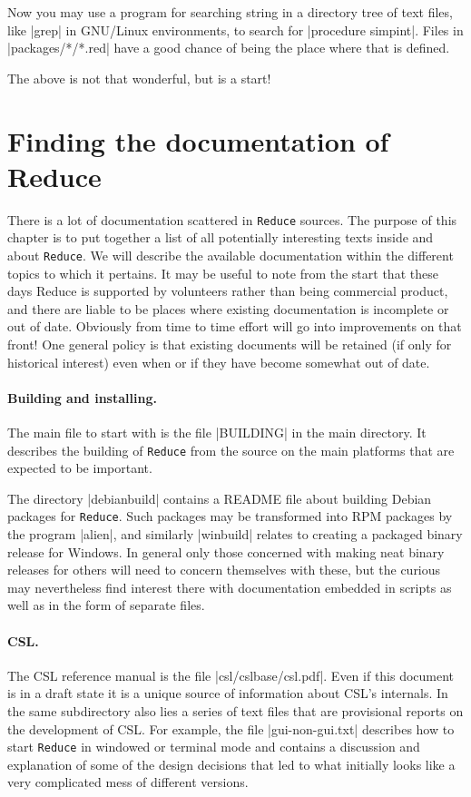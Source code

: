 \documentclass[12pt,twoside,openright]{memoir}
\newcommand{\reduce}{\texttt{Reduce}\xspace}
\begin{document}
Now you may use a program for searching string in a directory tree of text
files, like |grep| in GNU/Linux environments, to search for
|procedure simpint|. Files in |packages/*/*.red| have a good chance of being
the place where that is defined.

The above is not that wonderful, but is a start!


\section{Finding the documentation of Reduce}

There is a lot of documentation scattered in \reduce sources. The purpose of
this chapter is to put together a list of all potentially interesting texts
inside and about \reduce. We will describe the available documentation within
the different topics to which it pertains.
It may be useful to note from the start that these days Reduce is supported
by volunteers rather than being commercial product, and there are liable to
be places where existing documentation is incomplete or out of date. Obviously
from time to time effort will go into improvements on that front! One general
policy is that existing documents will be retained (if only for historical
interest) even when or if they have become somewhat out of date. 

\paragraph{Building and installing.}
The main file to start with is the file |BUILDING| in the main directory. It
describes the building of \reduce from the source on the main platforms
that are expected to be important.

The directory |debianbuild| contains a README file about building Debian
packages for \reduce. Such packages may be transformed into RPM packages by the
program |alien|, and similarly |winbuild| relates to creating a packaged
binary release for Windows. In general only those concerned with making
neat binary releases for others will need to concern themselves with these,
but the curious may nevertheless find interest there with documentation
embedded in scripts as well as in the form of separate files.

\paragraph{CSL.}
The CSL reference manual is the file |csl/cslbase/csl.pdf|. Even if this
document is in a draft state it is a unique source of information about CSL's
internals. In the same subdirectory also lies a series of text files that are
provisional reports on the development of CSL. For example, the
file |gui-non-gui.txt| describes how to start \reduce in windowed or terminal
mode and contains a discussion and explanation of some of the design
decisions that led to what initially looks like a very complicated
mess of different versions.
\end{document}
